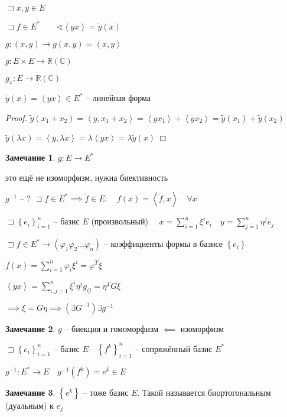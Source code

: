 \documentclass{book}
\newcommand\R{\ensuremath{\mathbb{R}}}
\renewcommand\C{\ensuremath{\mathbb{C}}}
\newcommand{\tl}[1]{\widetilde{#1}}
\theoremstyle{definition}
\newtheorem*{note}{Замечание}
\begin{document}
$\sqsupset x, y\in E$

$\sqsupset f \in E^*\qquad \sphericalangle \left<y x \right> = \tl y(x)$

$g: (x, y) \to g(x, y) = \left<x, y \right>$

$g:E \times E \to  \R (\C)$

$g_x: E \to \R(\C) $

\begin{lemma}
    $\tl y(x) = \left< y x \right> \in E^*$ -- линейная форма
\end{lemma}
\begin{proof}
    $\tl y(x_1 + x_2) = \left< y, x_1 + x_2 \right> = \left<y x_1 \right> + \left<y x_2 \right> = \tl y(x_1) + \tl y(x_2)$

    $\tl y(\lambda x) = \left<y, \lambda x \right> = \lambda \left<y x \right> = \lambda \tl y(x)$
\end{proof}

\begin{note}
    $g: E \to E^*$

    это ещё не изоморфизм, нужна биективность

    $g^{-1}$ -- ? $\sqsupset f\in E^* \implies \tl f \in E:\quad f(x) = \left<\tl f, x \right> \quad \forall x$

    $\sqsupset \left\{ e_i \right\} _{i=1}^n $ -- базис $E$ (произвольный)  $\quad x = \sum_{i=1}^{n} \xi^ie_i\quad y = \sum_{j=1}^{n} \eta^je_j$

    $\sqsupset f\in E^* \to \left( \varphi_1 \varphi_2 \ldots \varphi_n \right) $ -- коэффициенты формы в базисе $\left\{ e_i \right\} $

    $f(x) = \sum_{i=1}^{n} \varphi_i\xi^i = \varphi^T\xi$

    $\left< y x  \right> = \sum_{i, j = 1}^{n} \xi^i\eta^jg_{ij} = \eta^T G \xi$ 

    $\implies \xi = G\eta \implies \left(\exists  G^{-1} \right)  \exists g^{-1}$
\end{note}

\begin{note}
    $g$ -- биекция и гомоморфизм  $\impliedby $ изоморфизм
\end{note}

$\sqsupset \left\{ e_i \right\} _{i=1}^n$ -- базис $E\quad \left\{ f^k \right\} _{i=1}^n$ -- сопряжённый базис $E^*$

$g^{-1} : E ^* \to  E\quad g^{-1}(f^k) = e^k\in E$

\begin{note}
    $\left\{ e^k \right\} $ -- тоже базис $E$. Такой называется биортогональным (дуальным) к $e_j$
\end{note}
\end{document}
